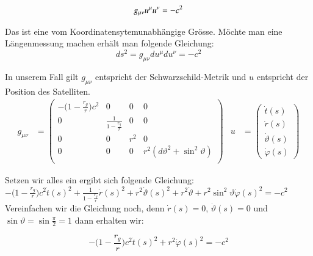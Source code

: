 \begin{refsection}
\begin{equation}
g_{\mu\nu}u^\mu u^\nu=-c^2 \\
\end{equation}

\noindent{}Das ist eine vom Koordinatensytemunabhängige Grösse. Möchte man eine Längenmessung machen erhält man folgende Gleichung: \\

\begin{equation}
ds^2 = g_{\mu\nu}du^\mu du^\nu = -c^2
\end{equation}

In unserem Fall gilt \( g_{\mu\nu} \) entspricht der Schwarzschild-Metrik und \( u \) entspricht der Position des Satelliten. \\

\begin{align*}
g_{\mu\nu} &= 
\begin{pmatrix}
-\biggl(1-\frac{r_g}r\biggr)c^2 & 0 & 0 & 0 \\
0 & \frac1{\displaystyle 1-\frac{r_g}r} & 0 & 0 \\
0 & 0 &  r^2 & 0 \\
0 & 0 & 0 &  r^2(d\vartheta^2 + \sin^2\vartheta) \\
\end{pmatrix} &
u &= 
\begin{pmatrix}
\dot t(s) \\
\dot r(s) \\
\dot \vartheta (s) \\
\dot \varphi (s)
\end{pmatrix}
\end{align*}

\noindent{}Setzen wir alles ein ergibt sich folgende Gleichung: \\

\( -\biggl(1-\frac{r_g}r\biggr)c^2 \dot t(s)^2 +  \frac1{\displaystyle 1-\frac{r_g}r} \dot r(s)^2 + r^2 \dot \vartheta(s)^2 + r^2 \dot \vartheta + r^2 \sin^2 \vartheta \dot \varphi (s)^2 = -c^2 \) \\

\noindent{}Vereinfachen wir die Gleichung noch, denn \( \dot r(s) = 0 \), \( \dot \vartheta(s) = 0 \) und \( \sin \vartheta = \sin \frac{\pi}{2} = 1 \) dann erhalten wir:

\begin{equation}
-\biggl(1-\frac{r_g}r\biggr)c^2 \dot t(s)^2 + r^2  \dot \varphi (s)^2 = -c^2 
\end{equation}


\end{refsection}
